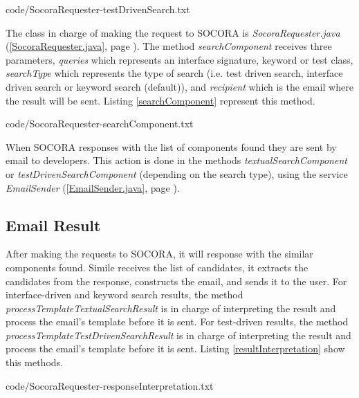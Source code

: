 
{code/SocoraRequester-testDrivenSearch.txt}

The class in charge of making the request to SOCORA is \emph{SocoraRequester.java} (\ref{SocoraRequester.java}, page \pageref{SocoraRequester.java}). The method \emph{searchComponent} receives three parameters, \emph{queries} which represents an interface signature, keyword or test class, \emph{searchType} which represents the type of search (i.e. test driven search, interface driven search or keyword search (default)), and \emph{recipient} which is the email where the result will be sent. Listing \ref{searchComponent} represent this method.


{code/SocoraRequester-searchComponent.txt}

When SOCORA responses with the list of components found they are sent by email to developers. This action is done in the methods \emph{textualSearchComponent} or \emph{testDrivenSearchComponent} (depending on the search type), using the service \emph{EmailSender} (\ref{EmailSender.java}, page \pageref{EmailSender.java}).

\subsection{Email Result}
After making the requests to SOCORA, it will response with the similar components found. Simile receives the list of candidates, it extracts the candidates from the response, constructs the email, and sends it to the user. For interface-driven and keyword search results, the method \emph{processTemplateTextualSearchResult} is in charge of interpreting the result and process the email's template before it is sent. For test-driven results, the method \emph{processTemplateTestDrivenSearchResult} is in charge of interpreting the result and process the email's template before it is sent. Listing \ref{resultInterpretation} show this methods.


{code/SocoraRequester-responseInterpretation.txt}

